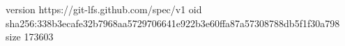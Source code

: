 version https://git-lfs.github.com/spec/v1
oid sha256:338b3ecafe32b7968aa5729706641e922b3e60ffa87a57308788db5f1f30a798
size 173603
